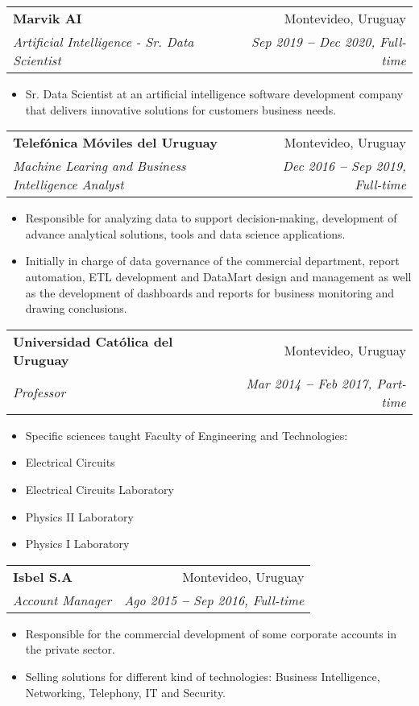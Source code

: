 \documentclass[letterpaper,11pt]{article}
\makeatletter
\newcommand{\resumeItem}[1]{
  \item\small{
    {#1 \vspace{-2pt}}
  }
}
\newcommand{\resumeSubheading}[4]{
  \vspace{-2pt}\item
    \begin{tabular*}{0.97\textwidth}[t]{l@{\extracolsep{\fill}}r}
      \textbf{#1} & #2 \\
      \textit{\small#3} & \textit{\small #4} \\
    \end{tabular*}\vspace{-7pt}
}
\newcommand{\resumeSubItem}[1]{\resumeItem{#1}\vspace{-4pt}}
\newcommand{\resumeItemListStart}{\begin{itemize}}
\newcommand{\resumeItemListEnd}{\end{itemize}\vspace{-5pt}}
\makeatother
\begin{document}
        \resumeSubheading
            {Marvik AI}{Montevideo, Uruguay}
            {Artificial Intelligence - Sr. Data Scientist}{Sep 2019 \textbf{--} Dec 2020, Full-time}
            \resumeItemListStart
                \resumeItem{Sr. Data Scientist at an artificial intelligence software development company that delivers innovative solutions for customers business needs.}
            \resumeItemListEnd

        \resumeSubheading
            {Telefónica Móviles del Uruguay}{Montevideo, Uruguay}
            {Machine Learing and Business Intelligence Analyst}{Dec 2016 \textbf{--} Sep 2019, Full-time}
            \resumeItemListStart
                \resumeItem{Responsible for analyzing data to support decision-making, development of advance analytical solutions, tools and data science applications.}
                \resumeItem{Initially in charge of data governance of the commercial department, report automation, ETL development and DataMart design and management as well as the development of dashboards and reports for business monitoring and drawing conclusions.}
            \resumeItemListEnd

        \resumeSubheading
            {Universidad Católica del Uruguay}{Montevideo, Uruguay}
            {Professor}{Mar 2014 \textbf{--} Feb 2017, Part-time}
            \resumeItemListStart
                \resumeItem{Specific sciences taught Faculty of Engineering and Technologies:}
                \resumeSubItem{Electrical Circuits} \\ \vspace{3pt}
                \resumeSubItem{Electrical Circuits Laboratory} \\ \vspace{3pt}
                \resumeSubItem{Physics II Laboratory} \\ \vspace{3pt}
                \resumeSubItem{Physics I Laboratory} \\ \vspace{3pt}
            \resumeItemListEnd
        
        \resumeSubheading
            {Isbel S.A}{Montevideo, Uruguay}
            {Account Manager}{Ago 2015 \textbf{--} Sep 2016, Full-time}
            \resumeItemListStart
                \resumeItem{Responsible for the commercial development of some corporate accounts in the private sector.}
                \resumeItem{Selling solutions for different kind of technologies: Business Intelligence, Networking, Telephony, IT and Security.}
            \resumeItemListEnd
\end{document}
